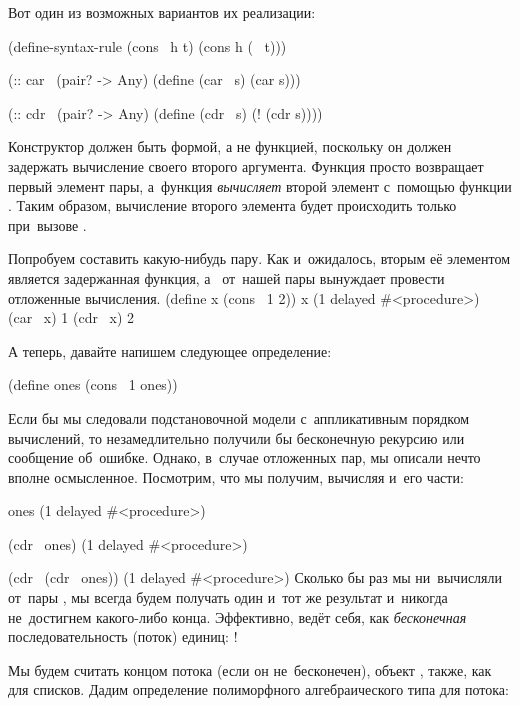 \label{lazy-cons}Вот один из возможных вариантов их реализации: 

\newpage
\begin{Definition}[emph={h,t,s}]
(define-syntax-rule (cons~ h t)
 (cons h (~ t)))

(:: car~ (pair? -> Any)
 (define (car~ s) (car s)))

(:: cdr~ (pair? -> Any)
 (define (cdr~ s) (! (cdr s))))
\end{Definition}

Конструктор  должен быть формой, а не функцией, поскольку он должен задержать вычисление своего второго аргумента. Функция  просто возвращает первый элемент пары, а~функция  \emph{вычисляет} второй элемент с~помощью функции \s{!}. Таким образом, вычисление второго элемента будет происходить только при~вызове .

\begin{example}{Попробуем составить какую-нибудь пару. Как и~ожидалось, вторым её элементом является задержанная функция, а~ от~нашей пары вынуждает провести отложенные вычисления.}
\REPLin
  {(define x (cons~ 1 2))}
\REPL
  {x}
  {(1 delayed \#<procedure>)}
\REPL
  {(car~ x)}
  {1}
\REPL
  {(cdr~ x)}
  {2}
\end{example}

А теперь, давайте напишем следующее определение:

\begin{Definition}
(define ones (cons~ 1 ones))
\end{Definition}

Если бы мы следовали подстановочной модели с~аппликативным порядком вычислений, то незамедлительно получили бы бесконечную рекурсию или сообщение об~ошибке. Однако, в~случае отложенных пар, мы описали нечто вполне осмысленное. Посмотрим, что мы получим, вычисляя  и~его части:

\REPL
  {ones}
  {(1 delayed \#<procedure>)}

\REPL
  {(cdr~ ones)}
  {(1 delayed \#<procedure>)}

\REPL
  {(cdr~ (cdr~ ones))}
  {(1 delayed \#<procedure>)}
\newpage%
\noindent%
Сколько бы раз мы ни~вычисляли  от~пары , мы всегда будем получать один и~тот же результат и~никогда не~достигнем какого-либо конца. Эффективно,  ведёт себя, как \emph{бесконечная} последовательность (поток) единиц: !

Мы будем считать концом потока (если он не~бесконечен), объект , также, как для списков. Дадим определение полиморфного алгебраического типа для потока:

